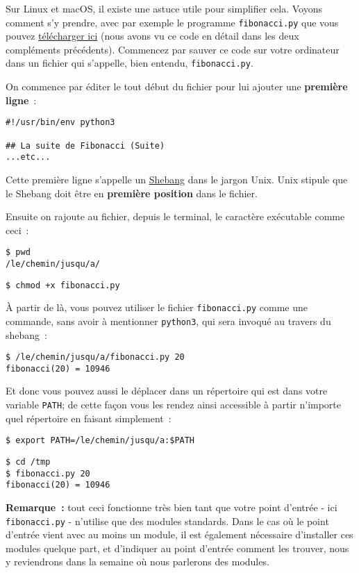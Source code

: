     Sur Linux et macOS, il existe une astuce utile pour simplifier cela.
Voyons comment s'y prendre, avec par exemple le programme
\texttt{fibonacci.py} que vous pouvez
\href{data/fibonacci.py}{télécharger ici} (nous avons vu ce code en
détail dans les deux compléments précédents). Commencez par sauver ce
code sur votre ordinateur dans un fichier qui s'appelle, bien entendu,
\texttt{fibonacci.py}.

    On commence par éditer le tout début du fichier pour lui ajouter une
\textbf{première ligne}~:

    \begin{verbatim}
#!/usr/bin/env python3

## La suite de Fibonacci (Suite)
...etc...
\end{verbatim}

    Cette première ligne s'appelle un
\href{http://en.wikipedia.org/wiki/Shebang_\%28Unix\%29}{Shebang} dans
le jargon Unix. Unix stipule que le Shebang doit être en
\textbf{première position} dans le fichier.

    Ensuite on rajoute au fichier, depuis le terminal, le caractère
exécutable comme ceci~:

    \begin{verbatim}
$ pwd
/le/chemin/jusqu/a/
\end{verbatim}

    \begin{verbatim}
$ chmod +x fibonacci.py
\end{verbatim}

    À partir de là, vous pouvez utiliser le fichier \texttt{fibonacci.py}
comme une commande, sans avoir à mentionner \texttt{python3}, qui sera
invoqué au travers du shebang~:

    \begin{verbatim}
$ /le/chemin/jusqu/a/fibonacci.py 20
fibonacci(20) = 10946
\end{verbatim}

    Et donc vous pouvez aussi le déplacer dans un répertoire qui est dans
votre variable \texttt{PATH}; de cette façon vous les rendez ainsi
accessible à partir n'importe quel répertoire en faisant simplement~:

    \begin{verbatim}
$ export PATH=/le/chemin/jusqu/a:$PATH
\end{verbatim}

    \begin{verbatim}
$ cd /tmp
$ fibonacci.py 20
fibonacci(20) = 10946
\end{verbatim}

    \textbf{Remarque~:} tout ceci fonctionne très bien tant que votre point
d'entrée - ici \texttt{fibonacci.py} - n'utilise que des modules
standards. Dans le cas où le point d'entrée vient avec au moins un
module, il est également nécessaire d'installer ces modules quelque
part, et d'indiquer au point d'entrée comment les trouver, nous y
reviendrons dans la semaine où nous parlerons des modules.


    
    
    
